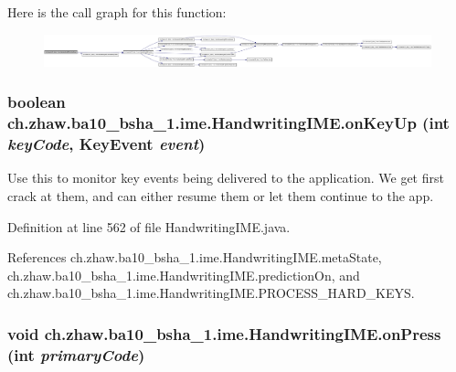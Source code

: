 Here is the call graph for this function:\nopagebreak
\begin{figure}[H]
\begin{center}
\leavevmode
\includegraphics[width=420pt]{classch_1_1zhaw_1_1ba10__bsha__1_1_1ime_1_1HandwritingIME_a999c8827bbffc0388be05c9e87e2ac49_cgraph}
\end{center}
\end{figure}
\hypertarget{classch_1_1zhaw_1_1ba10__bsha__1_1_1ime_1_1HandwritingIME_a3d39e17d6aa63cc1b2564dcb2022c8ec}{
\subsubsection[{onKeyUp}]{\setlength{\rightskip}{0pt plus 5cm}boolean ch.zhaw.ba10\_\-bsha\_\-1.ime.HandwritingIME.onKeyUp (int {\em keyCode}, \/  KeyEvent {\em event})}}
\label{classch_1_1zhaw_1_1ba10__bsha__1_1_1ime_1_1HandwritingIME_a3d39e17d6aa63cc1b2564dcb2022c8ec}
Use this to monitor key events being delivered to the application. We get first crack at them, and can either resume them or let them continue to the app. 

Definition at line 562 of file HandwritingIME.java.

References ch.zhaw.ba10\_\-bsha\_\-1.ime.HandwritingIME.metaState, ch.zhaw.ba10\_\-bsha\_\-1.ime.HandwritingIME.predictionOn, and ch.zhaw.ba10\_\-bsha\_\-1.ime.HandwritingIME.PROCESS\_\-HARD\_\-KEYS.\hypertarget{classch_1_1zhaw_1_1ba10__bsha__1_1_1ime_1_1HandwritingIME_abb77d1d11f616d5980ea16858a6b6190}{
\subsubsection[{onPress}]{\setlength{\rightskip}{0pt plus 5cm}void ch.zhaw.ba10\_\-bsha\_\-1.ime.HandwritingIME.onPress (int {\em primaryCode})}}
\label{classch_1_1zhaw_1_1ba10__bsha__1_1_1ime_1_1HandwritingIME_abb77d1d11f616d5980ea16858a6b6190}


